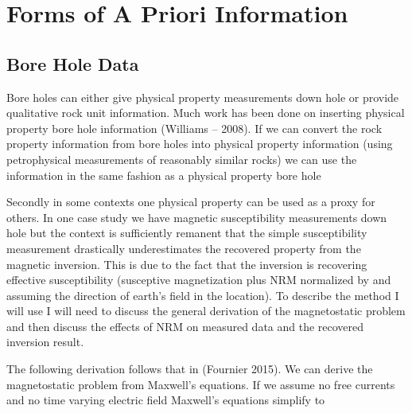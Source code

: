 \section{Forms of A Priori Information}
\label{sec:Forms of A Priori Information}

\subsection{Bore Hole Data}
\label{sec: Bore Hole Data}

Bore holes can either give physical property measurements down hole or provide qualitative rock unit information. Much work has been done on inserting physical property bore hole information (Williams – 2008). If we can convert the  rock property information from bore holes into physical property information (using petrophysical measurements of reasonably similar rocks) we can use the information in the same fashion as a physical property bore hole

Secondly in some contexts one physical property can be used as a proxy for others. In one case study we have magnetic susceptibility measurements down hole but the context is sufficiently remanent that the simple susceptibility measurement drastically underestimates the recovered property from the magnetic inversion. This is due to the fact that the inversion is recovering effective susceptibility (susceptive magnetization plus \ac{NRM} normalized by and assuming the direction of earth's field in the location). To describe the method I will use I will need to discuss the general derivation of the magnetostatic problem and then discuss the effects of \ac{NRM} on measured data and the recovered inversion result. 

The following derivation follows that in (Fournier 2015). We can derive the magnetostatic problem from Maxwell's equations. If we assume no free currents and no time varying electric field Maxwell's equations simplify to 

